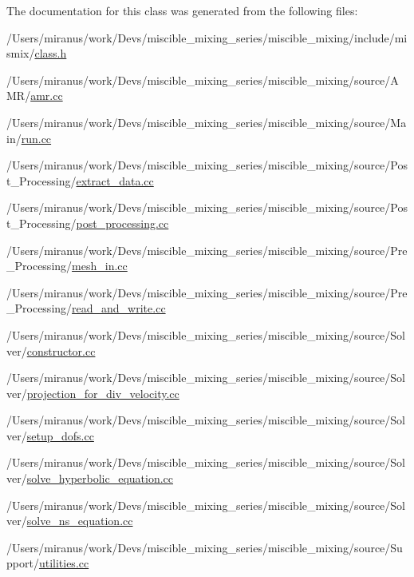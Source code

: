 The documentation for this class was generated from the following files\+:\begin{DoxyCompactItemize}
\item 
/\+Users/miranus/work/\+Devs/miscible\+\_\+mixing\+\_\+series/miscible\+\_\+mixing/include/mismix/\hyperlink{class_8h}{class.\+h}\item 
/\+Users/miranus/work/\+Devs/miscible\+\_\+mixing\+\_\+series/miscible\+\_\+mixing/source/\+A\+M\+R/\hyperlink{amr_8cc}{amr.\+cc}\item 
/\+Users/miranus/work/\+Devs/miscible\+\_\+mixing\+\_\+series/miscible\+\_\+mixing/source/\+Main/\hyperlink{run_8cc}{run.\+cc}\item 
/\+Users/miranus/work/\+Devs/miscible\+\_\+mixing\+\_\+series/miscible\+\_\+mixing/source/\+Post\+\_\+\+Processing/\hyperlink{extract__data_8cc}{extract\+\_\+data.\+cc}\item 
/\+Users/miranus/work/\+Devs/miscible\+\_\+mixing\+\_\+series/miscible\+\_\+mixing/source/\+Post\+\_\+\+Processing/\hyperlink{post__processing_8cc}{post\+\_\+processing.\+cc}\item 
/\+Users/miranus/work/\+Devs/miscible\+\_\+mixing\+\_\+series/miscible\+\_\+mixing/source/\+Pre\+\_\+\+Processing/\hyperlink{mesh__in_8cc}{mesh\+\_\+in.\+cc}\item 
/\+Users/miranus/work/\+Devs/miscible\+\_\+mixing\+\_\+series/miscible\+\_\+mixing/source/\+Pre\+\_\+\+Processing/\hyperlink{read__and__write_8cc}{read\+\_\+and\+\_\+write.\+cc}\item 
/\+Users/miranus/work/\+Devs/miscible\+\_\+mixing\+\_\+series/miscible\+\_\+mixing/source/\+Solver/\hyperlink{constructor_8cc}{constructor.\+cc}\item 
/\+Users/miranus/work/\+Devs/miscible\+\_\+mixing\+\_\+series/miscible\+\_\+mixing/source/\+Solver/\hyperlink{projection__for__div__velocity_8cc}{projection\+\_\+for\+\_\+div\+\_\+velocity.\+cc}\item 
/\+Users/miranus/work/\+Devs/miscible\+\_\+mixing\+\_\+series/miscible\+\_\+mixing/source/\+Solver/\hyperlink{setup__dofs_8cc}{setup\+\_\+dofs.\+cc}\item 
/\+Users/miranus/work/\+Devs/miscible\+\_\+mixing\+\_\+series/miscible\+\_\+mixing/source/\+Solver/\hyperlink{solve__hyperbolic__equation_8cc}{solve\+\_\+hyperbolic\+\_\+equation.\+cc}\item 
/\+Users/miranus/work/\+Devs/miscible\+\_\+mixing\+\_\+series/miscible\+\_\+mixing/source/\+Solver/\hyperlink{solve__ns__equation_8cc}{solve\+\_\+ns\+\_\+equation.\+cc}\item 
/\+Users/miranus/work/\+Devs/miscible\+\_\+mixing\+\_\+series/miscible\+\_\+mixing/source/\+Support/\hyperlink{utilities_8cc}{utilities.\+cc}\end{DoxyCompactItemize}
